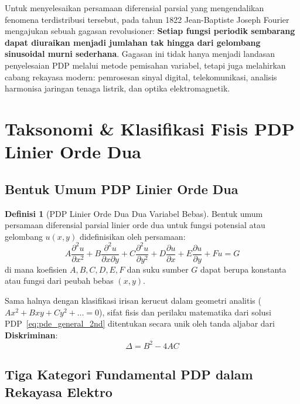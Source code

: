 \documentclass[11pt,a4paper]{article}
\theoremstyle{definition}
\newtheorem{definition}{Definisi}[section]
\begin{document}
Untuk menyelesaikan persamaan diferensial parsial yang mengendalikan fenomena terdistribusi tersebut, pada tahun 1822 Jean-Baptiste Joseph Fourier mengajukan sebuah gagasan revolusioner: \textbf{Setiap fungsi periodik sembarang dapat diuraikan menjadi jumlahan tak hingga dari gelombang sinusoidal murni sederhana}. Gagasan ini tidak hanya menjadi landasan penyelesaian PDP melalui metode pemisahan variabel, tetapi juga melahirkan cabang rekayasa modern: pemrosesan sinyal digital, telekomunikasi, analisis harmonisa jaringan tenaga listrik, dan optika elektromagnetik.

\section{Taksonomi \& Klasifikasi Fisis PDP Linier Orde Dua}

\subsection{Bentuk Umum PDP Linier Orde Dua}

\begin{definition}[PDP Linier Orde Dua Dua Variabel Bebas]
Bentuk umum persamaan diferensial parsial linier orde dua untuk fungsi potensial atau gelombang $u(x, y)$ didefinisikan oleh persamaan:
\begin{equation}
    A \frac{\partial^2 u}{\partial x^2} + B \frac{\partial^2 u}{\partial x \partial y} + C \frac{\partial^2 u}{\partial y^2} + D \frac{\partial u}{\partial x} + E \frac{\partial u}{\partial y} + F u = G
    \label{eq:pde_general_2nd}
\end{equation}
di mana koefisien $A, B, C, D, E, F$ dan suku sumber $G$ dapat berupa konstanta atau fungsi dari peubah bebas $(x, y)$.
\end{definition}

Sama halnya dengan klasifikasi irisan kerucut dalam geometri analitis ($Ax^2 + Bxy + Cy^2 + \dots = 0$), sifat fisis dan perilaku matematika dari solusi PDP~\eqref{eq:pde_general_2nd} ditentukan secara unik oleh tanda aljabar dari \textbf{Diskriminan}:
\begin{equation}
    \Delta = B^2 - 4AC
    \label{eq:pde_discriminant}
\end{equation}

\subsection{Tiga Kategori Fundamental PDP dalam Rekayasa Elektro}
\end{document}
